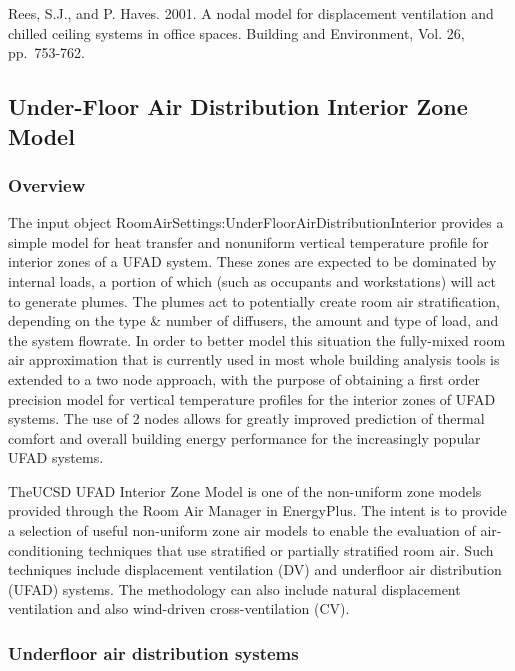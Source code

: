 Rees, S.J., and P. Haves. 2001. A nodal model for displacement ventilation and chilled ceiling systems in office spaces. Building and Environment, Vol. 26, pp.~753-762.

\subsection{Under-Floor Air Distribution Interior Zone Model}\label{under-floor-air-distribution-interior-zone-model}

\subsubsection{Overview}\label{overview-1-001}

The input object RoomAirSettings:UnderFloorAirDistributionInterior provides a simple model for heat transfer and nonuniform vertical temperature profile for interior zones of a UFAD system. These zones are expected to be dominated by internal loads, a portion of which (such as occupants and workstations) will act to generate plumes. The plumes act to potentially create room air stratification, depending on the type \& number of diffusers, the amount and type of load, and the system flowrate. In order to better model this situation the fully-mixed room air approximation that is currently used in most whole building analysis tools is extended to a two node approach, with the purpose of obtaining a first order precision model for vertical temperature profiles for the interior zones of UFAD systems. The use of 2 nodes allows for greatly improved prediction of thermal comfort and overall building energy performance for the increasingly popular UFAD systems.

TheUCSD UFAD Interior Zone Model is one of the non-uniform zone models provided through the Room Air Manager in EnergyPlus. The intent is to provide a selection of useful non-uniform zone air models to enable the evaluation of air-conditioning techniques that use stratified or partially stratified room air. Such techniques include displacement ventilation (DV) and underfloor air distribution (UFAD) systems. The methodology can also include natural displacement ventilation and also wind-driven cross-ventilation (CV).

\subsubsection{Underfloor air distribution systems}\label{underfloor-air-distribution-systems}

